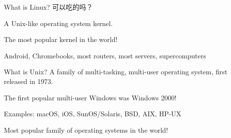 \documentclass[11pt]{beamer}
\begin{document}
\begin{frame}{What is Linux?}
  可以吃的吗？\pause

  A Unix-like operating system kernel.

  The most popular kernel in the world!

  Android, Chromebooks, most routers, most servers, supercomputers
\end{frame}

\begin{frame}{What is Unix?}
  A family of multi-tasking, multi-user operating system, first released in 1973.

  The first popular multi-user Windows was Windows 2000!

  Examples: macOS, iOS, SunOS/Solaris, BSD, AIX, HP-UX

  Most popular family of operating systems in the world!
\end{frame}
\end{document}
